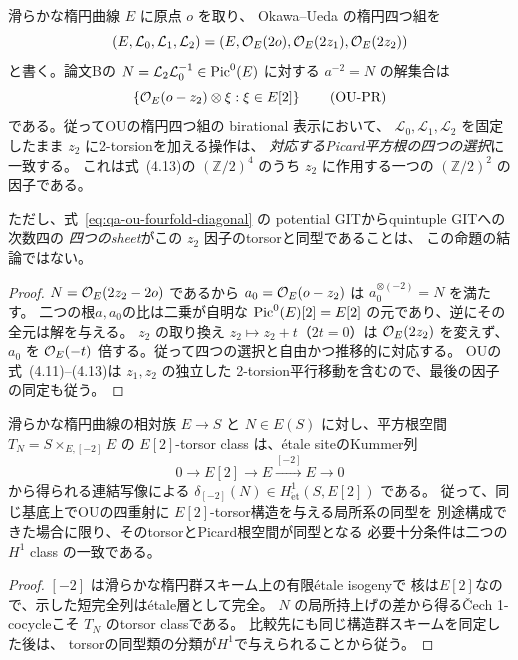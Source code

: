 \begin{proposition}
\label{prop:qa-ou-elliptic-half-coordinate}
滑らかな楕円曲線 $E$ に原点 $o$ を取り、
Okawa--Ueda \cite[\S4, (4.12)--(4.13)]{OU2014}
の楕円四つ組を
\[
 (E,\mathcal L_0,\mathcal L_1,\mathcal L_2)
 =
 (E,\mathcal O_E(2o),\mathcal O_E(2z_1),\mathcal O_E(2z_2))
\]
と書く。論文Bの
$N=\mathcal L_2\mathcal L_0^{-1}\in\operatorname{Pic}^0(E)$ に対する
$a^{-2}=N$ の解集合は
\[
 \left\{
 \mathcal O_E(o-z_2)\otimes\xi:\xi\in E[2]
 \right\}
 \tag{OU-PR}\label{eq:qa-ou-elliptic-half-coordinate}
\]
である。従ってOUの楕円四つ組の birational 表示において、
$\mathcal L_0,\mathcal L_1,\mathcal L_2$ を固定したまま
$z_2$ に2-torsionを加える操作は、
\emph{対応するPicard平方根の四つの選択}に一致する。
これは式~(4.13)の $(\mathbb Z/2)^4$ のうち
$z_2$ に作用する一つの $(\mathbb Z/2)^2$ の因子である。

ただし、式~\eqref{eq:qa-ou-fourfold-diagonal} の
potential GITからquintuple GITへの次数四の
\emph{四つのsheet}がこの $z_2$ 因子のtorsorと同型であることは、
この命題の結論ではない。
\end{proposition}
\begin{proof}
$N=\mathcal O_E(2z_2-2o)$ であるから
$a_0=\mathcal O_E(o-z_2)$ は
$a_0^{\otimes(-2)}=N$ を満たす。
二つの根$a,a_0$の比は二乗が自明な
$\operatorname{Pic}^0(E)[2]=E[2]$ の元であり、逆にその全元は解を与える。
$z_2$ の取り換え $z_2\mapsto z_2+t$（$2t=0$）は
$\mathcal O_E(2z_2)$ を変えず、$a_0$ を
$\mathcal O_E(-t)$ 倍する。従って四つの選択と自由かつ推移的に対応する。
OUの式~(4.11)--(4.13)は $z_1,z_2$ の独立した
2-torsion平行移動を含むので、最後の因子の同定も従う。
\end{proof}

\begin{lemma}
\label{lem:qa-picard-kummer-torsor}
滑らかな楕円曲線の相対族 $E\to S$ と
$N\in E(S)$ に対し、平方根空間
$T_N=S\times_{E,[-2]}E$ の
$E[2]$-torsor class は、étale siteのKummer列
\[
 0\longrightarrow E[2]\longrightarrow E
 \xrightarrow{[-2]}E\longrightarrow0
\]
から得られる連結写像による
$\delta_{[-2]}(N)\in H^1_{\mathrm{\acute et}}(S,E[2])$
である。
従って、同じ基底上でOUの四重射に
$E[2]$-torsor構造を与える局所系の同型を
別途構成できた場合に限り、そのtorsorとPicard根空間が同型となる
必要十分条件は二つの $H^1$ class の一致である。
\end{lemma}
\begin{proof}
$[-2]$ は滑らかな楕円群スキーム上の有限étale isogenyで
核は$E[2]$なので、示した短完全列はétale層として完全。
$N$ の局所持上げの差から得るČech 1-cocycleこそ
$T_N$ のtorsor classである。
比較先にも同じ構造群スキームを同定した後は、
torsorの同型類の分類が$H^1$で与えられることから従う。
\end{proof}

